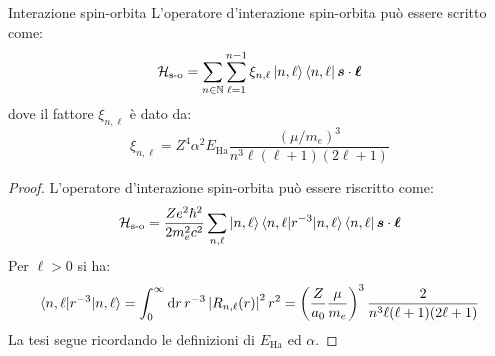 \begin{proposition}{Interazione spin-orbita}{}
	L'operatore d'interazione spin-orbita può essere scritto come:
	\begin{equation}
		\mathcal{H}_\text{s-o} = \sum_{n \in \mathbb{N}} \sum_{\ell = 1}^{n - 1} \xi_{n,\ell} \ket{n,\ell} \bra{n,\ell} \boldsymbol{s} \cdot \boldsymbol{\ell}
	\end{equation}
	dove il fattore $ \xi_{n,\ell} $ è dato da:
	\begin{equation}
		\xi_{n,\ell} = Z^4 \alpha^2 E_\text{Ha} \frac{(\mu / m_e)^3}{n^3 \ell (\ell + 1) (2\ell + 1)}
		\label{eq:1-e-int-spin-orb}
	\end{equation}

	\tcblower

	\begin{proof}
		L'operatore d'interazione spin-orbita può essere riscritto come:
		\begin{equation*}
			\mathcal{H}_\text{s-o} = \frac{Ze^2\hbar^2}{2m_e^2c^2} \sum_{n,\ell} \ket{n,\ell} \braket{n,\ell | r^{-3} | n,\ell} \bra{n,\ell} \boldsymbol{s} \cdot \boldsymbol{\ell}
		\end{equation*}
		Per $ \ell > 0 $ si ha:
		\begin{equation*}
			\braket{n,\ell | r^{-3} | n,\ell} = \int_0^\infty \mathrm{d} r\, r^{-3} \left\lvert R_{n,\ell}(r)\right\rvert^2 r^2 = \left( \frac{Z}{a_0} \frac{\mu}{m_e} \right)^3 \frac{2}{n^3 \ell (\ell + 1) (2\ell + 1)}
		\end{equation*}
		La tesi segue ricordando le definizioni di $ E_\text{Ha} $ ed $ \alpha $.
	\end{proof}
\end{proposition}

